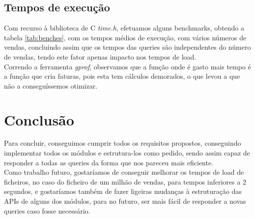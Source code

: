 \documentclass[a4paper]{report}
\begin{document}
\section{Tempos de execução}

Com recurso à biblioteca de C \textit{time.h}, efetuamos alguns benchmarks, obtendo
a tabela \ref{tab:benches}, com os tempos médios de execução, com vários números 
de vendas, concluindo assim que os tempos das queries são independentes do número de 
vendas, tendo este fator apenas impacto nos tempos de load.
\\
Correndo a ferramenta \textit{gprof}, observamos que a função onde é gasto mais tempo
é a função que cria faturas, pois esta tem cálculos demorados, o que levou a que não 
a conseguíssemos otimizar.

\chapter{Conclusão}

Para concluir, conseguimos cumprir todos os requisitos propostos, conseguindo implementar
todos os módulos e estrutura-los como pedido, sendo assim capaz de responder a todas as 
queries da forma que nos pareceu mais eficiente.\\
Como trabalho futuro, gostaríamos de conseguir melhorar os tempos de load de ficheiros,
no caso do ficheiro de um milhão de vendas, para tempos inferiores a 2 segundos, e
gostaríamos também de fazer ligeiras mudanças à estruturação das APIs de alguns dos 
módulos, para no futuro, ser mais fácil de responder a novas queries caso fosse 
necessário.

\appendix
\end{document}
